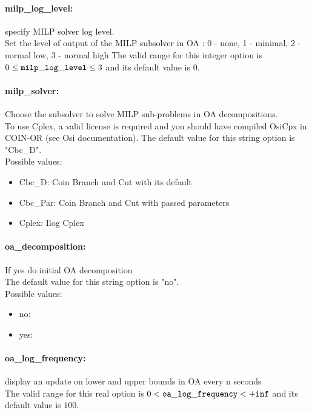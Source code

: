 \paragraph{milp\_log\_level:}\label{sec:milp_log_level} specify MILP solver log level. $\;$ \\
 Set the level of output of the MILP subsolver in
OA : 0 - none, 1 - minimal, 2 - normal low, 3 -
normal high The valid range for this integer option is
$0 \le {\tt milp\_log\_level } \le 3$
and its default value is $0$.


\paragraph{milp\_solver:}\label{sec:milp_solver} Choose the subsolver to solve MILP sub-problems in OA decompositions. $\;$ \\
  To use Cplex, a valid license is required and
you should have compiled OsiCpx in COIN-OR  (see
Osi documentation).
The default value for this string option is "Cbc\_D".
\\ 
Possible values:
\begin{itemize}
   \item Cbc\_D: Coin Branch and Cut with its default
   \item Cbc\_Par: Coin Branch and Cut with passed parameters
   \item Cplex: Ilog Cplex
\end{itemize}

\paragraph{oa\_decomposition:}\label{sec:oa_decomposition} If yes do initial OA decomposition $\;$ \\

The default value for this string option is "no".
\\ 
Possible values:
\begin{itemize}
   \item no: 
   \item yes: 
\end{itemize}

\paragraph{oa\_log\_frequency:}\label{sec:oa_log_frequency} display an update on lower and upper bounds in OA every n seconds $\;$ \\
 The valid range for this real option is 
$0 <  {\tt oa\_log\_frequency } <  {\tt +inf}$
and its default value is $100$.


